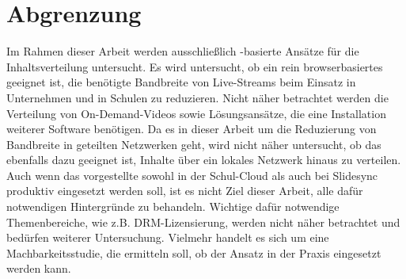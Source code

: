 \chapter{Abgrenzung}\label{ch:demarcation}

Im Rahmen dieser Arbeit werden ausschließlich \pTp-basierte Ansätze für die Inhaltsverteilung untersucht. Es wird untersucht, ob ein rein browserbasiertes \cdn geeignet ist, die benötigte Bandbreite von Live-Streams beim Einsatz in Unternehmen und in Schulen zu reduzieren. Nicht näher betrachtet werden die Verteilung von On-Demand-Videos sowie Lösungsansätze, die eine Installation weiterer Software benötigen. Da es in dieser Arbeit um die Reduzierung von Bandbreite in geteilten Netzwerken geht, wird nicht näher untersucht, ob das \cdn ebenfalls dazu geeignet ist, Inhalte über ein lokales Netzwerk hinaus zu verteilen. Auch wenn das vorgestellte \cdn sowohl in der Schul-Cloud als auch bei Slidesync produktiv eingesetzt werden soll, ist es nicht Ziel dieser Arbeit, alle dafür notwendigen Hintergründe zu behandeln. Wichtige dafür notwendige Themenbereiche, wie z.B. DRM-Lizensierung, werden nicht näher betrachtet und bedürfen weiterer Untersuchung. Vielmehr handelt es sich um eine Machbarkeitsstudie, die ermitteln soll, ob der Ansatz in der Praxis eingesetzt werden kann.
